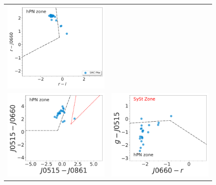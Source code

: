 \documentclass[11pt]{article}
\newcommand\raiselabel[1]{\raisebox{0.9\figwidth}[-0.5\figwidth]{#1}}
\begin{document}
\begin{figure}
\centering
\begin{tabular}{l l}
\includegraphics[width=0.5\linewidth, trim=10 10 10 10, clip]{Fig1-IDR2-SPLUS-vironen.pdf} & \\
 \includegraphics[width=0.5\linewidth, trim=10 10 10 10, clip]{Fig2-IDR2-SPLUS-J0515_J0660.pdf} & \includegraphics[width=0.5\linewidth, trim=10 10 10 10, clip]{Fig4-IDR2-SPLUS-g.pdf} \\

\end{tabular}
\end{figure}
\end{document}
